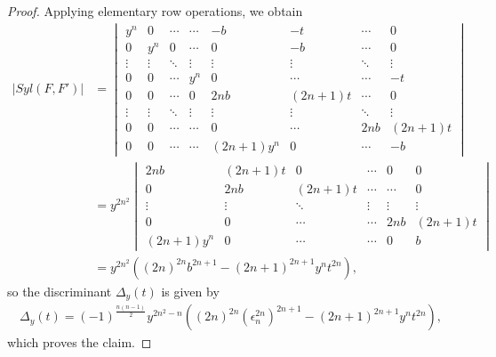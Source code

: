 \documentclass[10pt,a4paper]{amsart}
\newcommand{\ep}{\epsilon}
\begin{document}
\begin{proof}
Applying elementary row operations, we obtain
\begin{align*}
|Syl(F,F')|&=
\begin{vmatrix}
y^n & 0 & \cdots & \cdots & -b  & -t & \cdots & 0 \\
0 & y^n &0 & \cdots & 0  & -b & \cdots & 0 \\
\vdots & \vdots &\ddots & \vdots & \vdots &\vdots & \ddots &\vdots \\
0&0&\cdots&y^n&0&\cdots&\cdots&-t \\
0&0&\cdots&0&2nb&(2n+1)t&\cdots &0 \\
\vdots &\vdots &\ddots&\vdots &\vdots &\vdots &\ddots &\vdots \\
0&0&\cdots&\cdots&0&\cdots &2nb&(2n+1)t \\
0&0&\cdots&\cdots&(2n+1)y^n&0 &\cdots & -b
\end{vmatrix}\\
&=y^{2n^2} 
\begin{vmatrix}
2nb & (2n+1)t &0 & \cdots & 0  & 0  \\
0&2nb &(2n+1)t&\cdots&\cdots&0 \\
\vdots &\vdots &\ddots&\vdots &\vdots &\vdots \\
0&0&\cdots&\cdots &2nb&(2n+1)t \\
(2n+1)y^n&0&\cdots&\cdots &0& b
\end{vmatrix} \\
&=y^{2n^2}((2n)^{2n}b^{2n+1}-(2n+1)^{2n+1}y^n t^{2n}),
\end{align*}
so the discriminant $\Delta_y(t)$ is given by
\begin{align*}
\Delta_y(t)=(-1)^{\frac{n(n-1)}{2}} y^{2n^2-n}((2n)^{2n}({\ep_n^{2n}})^{2n+1}-(2n+1)^{2n+1}y^n t^{2n}),
\end{align*}
which proves the claim.
\end{proof}
\end{document}
